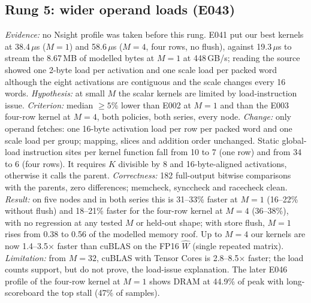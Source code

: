 \documentclass[sigconf,nonacm]{acmart}
\begin{document}
\subsection{Rung 5: wider operand loads (E043)}
\emph{Evidence:} no Nsight profile was taken before this rung. E041 put our best kernels at 38.4\,$\mu$s ($M=1$) and 58.6\,$\mu$s ($M=4$, four rows, no flush), against 19.3\,$\mu$s to stream the 8.67\,MB of modelled bytes at $M=1$ at 448\,GB/s; reading the source showed one 2-byte load per activation and one scale load per packed word although the eight activations are contiguous and the scale changes every 16 words. \emph{Hypothesis:} at small $M$ the scalar kernels are limited by load-instruction issue. \emph{Criterion:} median $\ge 5\%$ lower than E002 at $M=1$ and than the E003 four-row kernel at $M=4$, both policies, both series, every node. \emph{Change:} only operand fetches: one 16-byte activation load per row per packed word and one scale load per group; mapping, slices and addition order unchanged. Static global-load instruction sites per kernel function fall from 10 to 7 (one row) and from 34 to 6 (four rows). It requires $K$ divisible by 8 and 16-byte-aligned activations, otherwise it calls the parent. \emph{Correctness:} 182 full-output bitwise comparisons with the parents, zero differences; memcheck, synccheck and racecheck clean. \emph{Result:} on five nodes and in both series this is 31--33\% faster at $M=1$ (16--22\% without flush) and 18--21\% faster for the four-row kernel at $M=4$ (36--38\%), with no regression at any tested $M$ or held-out shape; with store flush, $M=1$ rises from 0.38 to 0.56 of the modelled memory roof. Up to $M=4$ our kernels are now 1.4--3.5$\times$ faster than cuBLAS on the FP16 $\hat W$ (single repeated matrix). \emph{Limitation:} from $M=32$, cuBLAS with Tensor Cores is 2.8--8.5$\times$ faster; the load counts support, but do not prove, the load-issue explanation. The later E046 profile of the four-row kernel at $M=1$ shows DRAM at 44.9\% of peak with long-scoreboard the top stall (47\% of samples).
\end{document}
